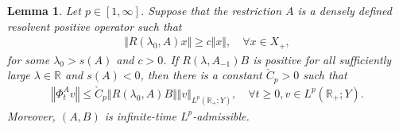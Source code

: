 \documentclass[onecolumn]{autart}
\def\R{{\mathbb{R}}}
\def\R{\mathbb R}
\newtheorem{lemma}{Lemma}[section]
\numberwithin{equation}{section}
\begin{document}
	\begin{lemma}\label{Lem-admi}
		Let $p \in [1, \infty]$. Suppose that the restriction $A$ is a densely defined resolvent positive operator such that
		\begin{align}\label{inverse-estimate}
			\Vert R(\lambda_0, A)x \Vert \geq c \Vert x \Vert, \quad \forall x \in X_+,
		\end{align}
		for some $\lambda_0 > s(A)$ and $c > 0$. If $R(\lambda,A_{-1})B$ is positive for all sufficiently large $\lambda \in \R$ and $s(A) < 0$, then there is a constant $\check{C}_p>0$ such that
		\begin{align*}
			\left\Vert \Phi_t^A v \right\Vert \le \check{C}_p \left\Vert R(\lambda_0, A) B \right\Vert \Vert v \Vert_{L^p(\R_+;Y)},\quad \forall t \ge 0,v \in L^p(\R_+; Y).
		\end{align*}
		Moreover, $(A,B)$ is infinite-time $L^p$-admissible.
	\end{lemma}
	
\end{document}

